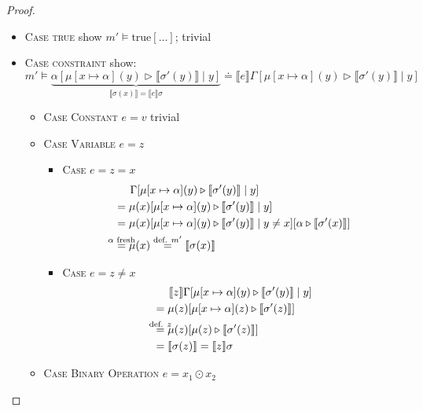 \documentclass[twoside, english]{sdqthesis}
\newcommand{\bbracket}[1]{\llbracket #1 \rrbracket}
\newcommand{\tr}[0]{\triangleright}
\theoremstyle{definition}
\begin{document}
\begin{proof}
\begin{itemize}
      \begin{itemize}
        \item \textsc{Case true} show $m' \vDash \text{true}[\dots]$; trivial
        \item \textsc{Case constraint} show:
          $$ m' \vDash 
            \underbrace{\alpha[\mu[x\mapsto \alpha](y) \tr \bbracket{\sigma'(y)} \mid y]}_{\bbracket{\sigma(x)}=\bbracket{e}\sigma}
            \doteq 
            \bbracket{e}\Gamma[\mu[x\mapsto \alpha](y) \tr \bbracket{\sigma'(y)} \mid y]
          $$
          \begin{itemize}
            \item \textsc{Case Constant} $e=v$ trivial
            \item \textsc{Case Variable} $e=z$
              \begin{itemize}
                \item \textsc{Case $e=z=x$} 
                  \begin{align*}
                    &\phantom{=}\ \ \Gamma[\mu[x\mapsto \alpha](y) \tr \bbracket{\sigma'(y)} \mid y]
                    \\ &= \mu(x)[\mu[x\mapsto \alpha](y) \tr \bbracket{\sigma'(y)} \mid y]
                    \\ &= \mu(x)[\mu[x\mapsto \alpha](y) \tr \bbracket{\sigma'(y)} \mid y \neq x][\alpha \tr \bbracket{\sigma'(x)} ]
                    \\ &\overset{\mathclap{\alpha \text{ fresh}}}{=} \mu(x) 
                      \overset{\text{def. } m'}{=} \bbracket{\sigma(x)}
                  \end{align*}
                \item \textsc{Case $e = z \neq x$}
                  \begin{align*}
                    &\phantom{=}\ \ \bbracket{z}\Gamma[\mu[x\mapsto \alpha](y) \tr \bbracket{\sigma'(y)} \mid y]
                    \\ &= \mu(z)[\mu[x\mapsto \alpha](z) \tr \bbracket{\sigma'(z)}]
                    \\ &\overset{\mathclap{\text{def. } z}}{=} \mu(z)[\mu(z) \tr \bbracket{\sigma'(z)}]
                    \\ &=\bbracket{\sigma(z)} = \bbracket{z}\sigma
                  \end{align*}
              \end{itemize}
            \item \textsc{Case Binary Operation} $e = x_1 \odot x_2$
              \begin{itemize}

\end{itemize}
\end{itemize}
\end{itemize}
\end{itemize}
\end{proof}
\end{document}
